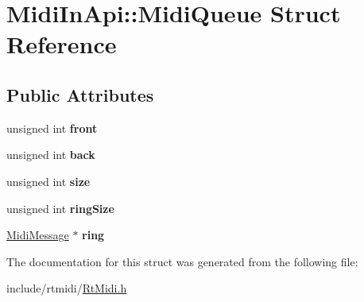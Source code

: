 \hypertarget{struct_midi_in_api_1_1_midi_queue}{}\section{Midi\+In\+Api\+:\+:Midi\+Queue Struct Reference}
\label{struct_midi_in_api_1_1_midi_queue}
\subsection*{Public Attributes}
\begin{DoxyCompactItemize}
\item 
unsigned int {\bfseries front}\hypertarget{struct_midi_in_api_1_1_midi_queue_aca2a7ac0b08f75379b86839b294fefa0}{}\label{struct_midi_in_api_1_1_midi_queue_aca2a7ac0b08f75379b86839b294fefa0}

\item 
unsigned int {\bfseries back}\hypertarget{struct_midi_in_api_1_1_midi_queue_a55c2276d55b8474584841e4b77b59a6b}{}\label{struct_midi_in_api_1_1_midi_queue_a55c2276d55b8474584841e4b77b59a6b}

\item 
unsigned int {\bfseries size}\hypertarget{struct_midi_in_api_1_1_midi_queue_aca884c721cbec5d564d75fd28306cda2}{}\label{struct_midi_in_api_1_1_midi_queue_aca884c721cbec5d564d75fd28306cda2}

\item 
unsigned int {\bfseries ring\+Size}\hypertarget{struct_midi_in_api_1_1_midi_queue_a4169b29319028962914d6cb702ce6a72}{}\label{struct_midi_in_api_1_1_midi_queue_a4169b29319028962914d6cb702ce6a72}

\item 
\hyperlink{struct_midi_in_api_1_1_midi_message}{Midi\+Message} $\ast$ {\bfseries ring}\hypertarget{struct_midi_in_api_1_1_midi_queue_a10d7814131bfd2744de4e82e6f8ee17e}{}\label{struct_midi_in_api_1_1_midi_queue_a10d7814131bfd2744de4e82e6f8ee17e}

\end{DoxyCompactItemize}


The documentation for this struct was generated from the following file\+:\begin{DoxyCompactItemize}
\item 
include/rtmidi/\hyperlink{_rt_midi_8h}{Rt\+Midi.\+h}\end{DoxyCompactItemize}
